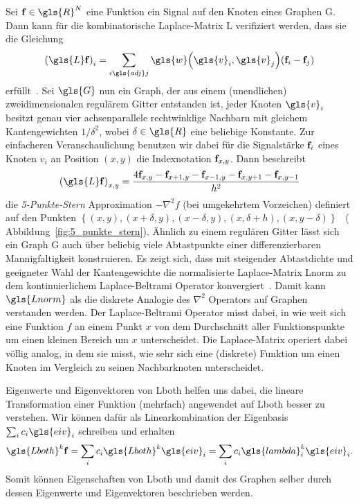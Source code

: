 Sei $\ve{f} \in \gls{R}^N$ eine Funktion \bzw{} ein Signal auf den Knoten eines Graphen \gls{G}.
Dann kann für die kombinatorische Laplace-Matrix \gls{L} verifiziert werden, dass sie die Gleichung
\begin{equation*}
  {\left(\gls{L}\ve{f}\right)}_i = \sum_{i \gls{adj} j} \gls{w}\left(\gls{v}_i, \gls{v}_j\right) \left(\ve{f}_i - \ve{f}_j\right)
\end{equation*}
erfüllt~\cite{Hammond}.
Sei $\gls{G}$ nun ein Graph, der aus einem (unendlichen) zweidimensionalen regulärem Gitter entstanden ist, \dhe{} jeder Knoten $\gls{v}_i$ besitzt genau vier achsenparallele rechtwinklige Nachbarn mit gleichem Kantengewichten $1/\delta^2$, wobei $\delta \in \gls{R}$ eine beliebige Konstante.
Zur einfacheren Veranschaulichung benutzen wir dabei für die Signalstärke $\mathbf{f}_i$ eines Knoten $v_i$ an Position $\left(x, y\right)$ die Indexnotation $\mathbf{f}_{x,y}$.
Dann beschreibt
\begin{equation*}
  {\left(\gls{L}\ve{f}\right)}_{x,y} = \frac{4\ve{f}_{x,y} - \ve{f}_{x+1,y} - \ve{f}_{x-1,y} - \ve{f}_{x,y+1} - \ve{f}_{x,y-1}}{h^2}
\end{equation*}
die \emph{5-Punkte-Stern} Approximation $-\nabla^2 f$ (bei umgekehrtem Vorzeichen) definiert auf den Punkten $\left\{\left(x,y\right), \left(x+\delta,y\right), \left(x-\delta,y\right), \left(x,\delta+h\right),\left(x,y-\delta\right)\right\}$~\cite{Hammond} (\vgl{} Abbildung~\ref{fig:5_punkte_stern}).
Ähnlich zu einem regulären Gitter lässt sich ein Graph \gls{G} auch über beliebig viele Abtastpunkte einer differenzierbaren Mannigfaltigkeit konstruieren.
Es zeigt sich, dass mit steigender Abtastdichte und geeigneter Wahl der Kantengewichte die normalisierte Laplace-Matrix \gls{Lnorm} zu dem kontinuierlichem Laplace-Beltrami Operator konvergiert~\cite{Hammond}.
Damit kann $\gls{Lnorm}$ als die diskrete Analogie des $\nabla^2$ Operators auf Graphen verstanden werden.
Der Laplace-Beltrami Operator misst dabei, in wie weit sich eine Funktion $f$ an einem Punkt $x$ von dem Durchschnitt aller Funktionspunkte um einen kleinen Bereich um $x$ unterscheidet.
Die Laplace-Matrix operiert dabei völlig analog, in dem sie misst, wie sehr sich eine (diskrete) Funktion um einen Knoten im Vergleich zu seinen Nachbarknoten unterscheidet.

Eigenwerte und Eigenvektoren von \gls{Lboth} helfen uns dabei, die lineare Transformation einer Funktion  (mehrfach) angewendet auf \gls{Lboth} besser zu verstehen.
Wir können dafür  als Linearkombination der Eigenbasis $\sum_i c_i \gls{eiv}_i$ schreiben und erhalten
\begin{equation*}
  \gls{Lboth}^k \ve{f} = \sum_i c_i \gls{Lboth}^k \gls{eiv}_i = \sum_i c_i \gls{lambda}_i^k \gls{eiv}_i.
\end{equation*}
Somit können Eigenschaften von \gls{Lboth} und damit des Graphen selber durch dessen Eigenwerte und Eigenvektoren beschrieben werden.


